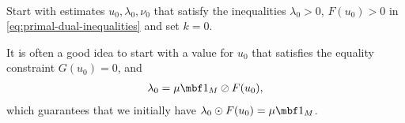 \documentclass[11pt]{article}
\begin{document}
\clearpage

\begin{algorithm}~\label{al:primal-dual-o}
\begin{steps}
\item Start with estimates $u_0,\lambda_0,\nu_0$ that satisfy the inequalities
  $\lambda_0>0$, $F(u_0)> 0$ in \eqref{eq:primal-dual-inequalities}
  and set $k=0$.

  It is often a good idea to start with a value for $u_0$ that
  satisfies the equality constraint $G(u_0)=0$, and
  \begin{align*}
    \lambda_0=\mu\mbf 1_{M}\oslash F(u_0),
  \end{align*}
  which guarantees that we initially have
  $\lambda_0\odot F(u_0)=\mu\mbf 1_{M}$.


\end{steps}
\end{algorithm}
\end{document}
